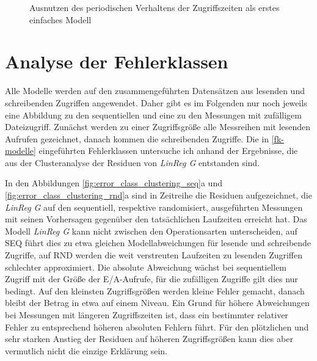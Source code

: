 \documentclass[
	12pt,
	a4paper,
	BCOR10mm,
	DIV14,
	listof=totoc,
	bibliography=totoc,
	headsepline
]{scrreprt}
\begin{document}
\begin{figure}
	\begin{center}
		\caption{Ausnutzen des periodischen Verhaltens der Zugriffszeiten als erstes einfaches Modell}
		\label{fig:periodicity100001}
	\end{center}
\end{figure} 
\clearpage

\section{Analyse der Fehlerklassen}
\label{eval:fk_analyse}
Alle Modelle werden auf den zusammengeführten Datensätzen aus lesenden und schreibenden Zugriffen angewendet. Daher gibt es im Folgenden nur noch jeweils eine Abbildung zu den sequentiellen und eine zu den Messungen mit zufälligem Dateizugriff.
Zunächst werden zu einer Zugriffsgröße alle Messreihen mit lesenden Aufrufen gezeichnet, danach kommen die schreibenden Zugriffe. 
Die in \ref{fk-modelle} eingeführten Fehlerklassen untersuche ich anhand der Ergebnisse, die aus der Clusteranalyse der Residuen von \textit{LinReg G} entstanden sind.\medskip

In den Abbildungen \ref{fig:error_class_clustering_seq}a und \ref{fig:error_class_clustering_rnd}a sind in Zeitreihe die Residuen aufgezeichnet, die \textit{LinReg G} auf den sequentiell, respektive randomisiert, ausgeführten Messungen mit seinen Vorhersagen gegenüber den tatsächlichen Laufzeiten erreicht hat.
Das Modell \textit{LinReg G} kann nicht zwischen den Operationsarten unterscheiden, auf SEQ führt dies zu etwa gleichen Modellabweichungen für lesende und schreibende Zugriffe, auf RND werden die weit verstreuten Laufzeiten zu lesenden Zugriffen schlechter approximiert.
Die absolute Abweichung wächst bei sequentiellem Zugriff mit der Größe der E/A-Aufrufe, für die zufälligen Zugriffe gilt dies nur bedingt. Auf den kleinsten Zugriffsgrößen werden kleine Fehler gemacht, danach bleibt der Betrag in etwa auf einem Niveau.
Ein Grund für höhere Abweichungen bei Messungen mit längeren Zugriffszeiten ist, dass ein bestimmter relativer Fehler zu entsprechend höheren absoluten Fehlern führt.
Für den plötzlichen und sehr starken Anstieg der Residuen auf höheren Zugriffsgrößen kann dies aber vermutlich nicht die einzige Erklärung sein.
\end{document}
